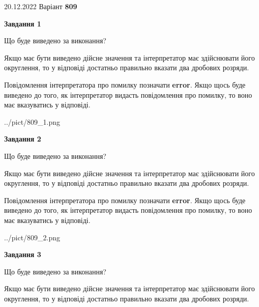 \documentclass[12pt, ukrainian]{article}
\begin{document}
{20.12.2022 Варіант \No \textbf { 809 }\par}
{
\begin {Large}

{\begin {center}\textbf{Завдання 1}\end {center}}\par
Що буде виведено за виконання? \par

Якщо має бути виведено дійсне значення та інтерпретатор має здійснювати його округлення, 
то у відповіді достатньо правильно вказати два дробових розряди.

Повідомлення інтерпретатора про помилку позначати \textbf{error}.
Якщо щось буде виведено до того, як інтерпретатор видасть повідомлення про помилку, 
то воно має вказуватись у відповіді. \par

\begin{center}
	{../pict/809_1.png}
\end{center}
\newpage

{\begin {center}\textbf{Завдання 2}\end {center}}\par
Що буде виведено за виконання? \par

Якщо має бути виведено дійсне значення та інтерпретатор має здійснювати його округлення, 
то у відповіді достатньо правильно вказати два дробових розряди.

Повідомлення інтерпретатора про помилку позначати \textbf{error}.
Якщо щось буде виведено до того, як інтерпретатор видасть повідомлення про помилку, 
то воно має вказуватись у відповіді. \par

\begin{center}
	{../pict/809_2.png}
\end{center}
\newpage

{\begin {center}\textbf{Завдання 3}\end {center}}\par
Що буде виведено за виконання? \par

Якщо має бути виведено дійсне значення та інтерпретатор має здійснювати його округлення, 
то у відповіді достатньо правильно вказати два дробових розряди.


\end{Large}}
\end{document}
